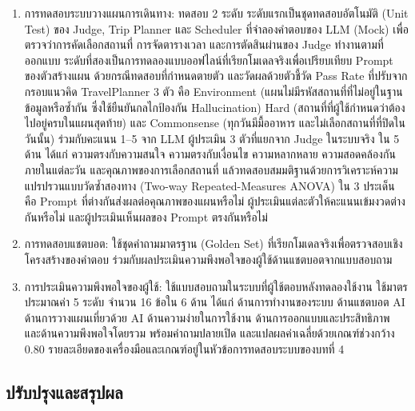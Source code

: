 \begin{enumerate}[label=(\arabic*),leftmargin=0pt,itemindent=\dimexpr\parindent+\parenlabelwidth+1em\relax,align=right,labelwidth=\parenlabelwidth,labelsep=1em]
\item การทดสอบระบบวางแผนการเดินทาง: ทดสอบ 2 ระดับ ระดับแรกเป็นชุดทดสอบอัตโนมัติ (Unit Test) ของ Judge, Trip Planner และ Scheduler ที่จำลองคำตอบของ LLM (Mock) เพื่อตรวจว่าการคัดเลือกสถานที่ การจัดตารางเวลา และการตัดสินผ่านของ Judge ทำงานตามที่ออกแบบ ระดับที่สองเป็นการทดลองแบบออฟไลน์ที่เรียกโมเดลจริงเพื่อเปรียบเทียบ Prompt ของตัวสร้างแผน ด้วยกรณีทดสอบที่กำหนดตายตัว และวัดผลด้วยตัวชี้วัด Pass Rate ที่ปรับจากกรอบแนวคิด TravelPlanner \parencite{xie2024} 3 ตัว คือ Environment (แผนไม่มีรหัสสถานที่ที่ไม่อยู่ในฐานข้อมูลหรือซ้ำกัน ซึ่งใช้ยืนยันกลไกป้องกัน Hallucination) Hard (สถานที่ที่ผู้ใช้กำหนดว่าต้องไปอยู่ครบในแผนสุดท้าย) และ Commonsense (ทุกวันมีมื้ออาหาร และไม่เลือกสถานที่ที่ปิดในวันนั้น) ร่วมกับคะแนน 1--5 จาก LLM ผู้ประเมิน 3 ตัวที่แยกจาก Judge ในระบบจริง ใน 5 ด้าน ได้แก่ ความตรงกับความสนใจ ความตรงกับเงื่อนไข ความหลากหลาย ความสอดคล้องกันภายในแต่ละวัน และคุณภาพของการเลือกสถานที่ แล้วทดสอบสมมติฐานด้วยการวิเคราะห์ความแปรปรวนแบบวัดซ้ำสองทาง (Two-way Repeated-Measures ANOVA) ใน 3 ประเด็น คือ Prompt ที่ต่างกันส่งผลต่อคุณภาพของแผนหรือไม่ ผู้ประเมินแต่ละตัวให้คะแนนเข้มงวดต่างกันหรือไม่ และผู้ประเมินเห็นผลของ Prompt ตรงกันหรือไม่

\item การทดสอบแชตบอต: ใช้ชุดคำถามมาตรฐาน (Golden Set) ที่เรียกโมเดลจริงเพื่อตรวจสอบเชิงโครงสร้างของคำตอบ ร่วมกับผลประเมินความพึงพอใจของผู้ใช้ด้านแชตบอตจากแบบสอบถาม

\item การประเมินความพึงพอใจของผู้ใช้: ใช้แบบสอบถามในระบบที่ผู้ใช้ตอบหลังทดลองใช้งาน ใช้มาตรประมาณค่า 5 ระดับ จำนวน 16 ข้อใน 6 ด้าน ได้แก่ ด้านการทำงานของระบบ ด้านแชตบอต AI ด้านการวางแผนเที่ยวด้วย AI ด้านความง่ายในการใช้งาน ด้านการออกแบบและประสิทธิภาพ และด้านความพึงพอใจโดยรวม พร้อมคำถามปลายเปิด และแปลผลค่าเฉลี่ยด้วยเกณฑ์ช่วงกว้าง 0.80 \parencite{best1981} รายละเอียดของเครื่องมือและเกณฑ์อยู่ในหัวข้อการทดสอบระบบของบทที่ 4
\end{enumerate}

\subsection{ปรับปรุงและสรุปผล}


